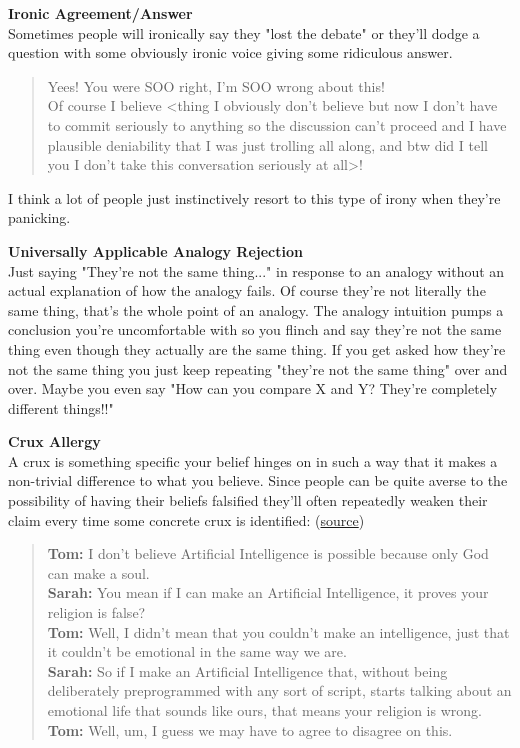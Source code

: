 \documentclass[12pt,english]{article}
\begin{document}
\par
\textbf{Ironic Agreement/Answer}\\
Sometimes people will ironically say they "lost the debate" or they'll dodge a question with some obviously ironic voice giving some ridiculous answer.\\
\begin{quote}

Yees! You were SOO right, I'm SOO wrong about this!\\ Of course I believe <thing I obviously don't believe but now I don't have to commit seriously to anything so the discussion can't proceed and I have plausible deniability that I was just trolling all along, and btw did I tell you I don't take this conversation seriously at all>!\\
\end{quote}
I think a lot of people just instinctively resort to this type of irony when they're panicking.
\par
\textbf{Universally Applicable Analogy Rejection}\\
Just saying "They're not the same thing..." in response to an analogy without an actual explanation of how the analogy fails. Of course they're not literally the same thing, that's the whole point of an analogy. The analogy intuition pumps a conclusion you're uncomfortable with so you flinch and say they're not the same thing even though they actually are the same thing. If you get asked how they're not the same thing you just keep repeating "they're not the same thing" over and over. Maybe you even say "How can you compare X and Y? They're completely different things!!"
\par
\textbf{Crux Allergy}\\
A crux is something specific your belief hinges on in such a way that it makes a non-trivial difference to what you believe. Since people can be quite averse to the possibility of having their beliefs falsified they'll often repeatedly weaken their claim every time some concrete crux is identified: (\href{https://www.lesswrong.com/posts/NKaPFf98Y5otMbsPk/bayesian-judo}{source})
\begin{quote}
    \textbf{Tom:} I don't believe Artificial Intelligence is possible because only God can make a soul.\\
    \textbf{Sarah:} You mean if I can make an Artificial Intelligence, it proves your religion is false?\\
    \textbf{Tom:} Well, I didn't mean that you couldn't make an intelligence, just that it couldn't be emotional in the same way we are.\\
    \textbf{Sarah:} So if I make an Artificial Intelligence that, without being deliberately preprogrammed with any sort of script, starts talking about an emotional life that sounds like ours, that means your religion is wrong.\\
    \textbf{Tom:} Well, um, I guess we may have to agree to disagree on this.\\
\end{quote}
\end{document}
